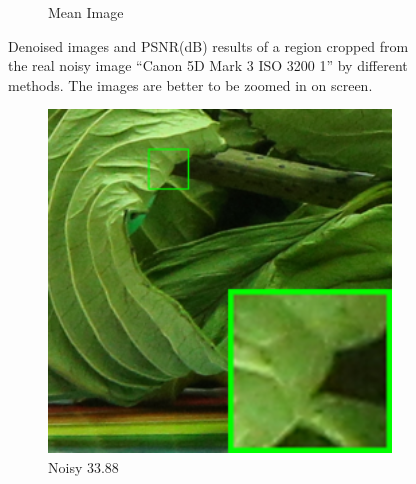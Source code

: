 \begin{figure}
\begin{subfigure}[t]{0.19\textwidth}
\caption{Mean Image}
    \end{subfigure}
    \caption{Denoised images and PSNR(dB) results of a region cropped from the real noisy image ``Canon 5D Mark 3 ISO 3200 1'' \cite{crosschannel2016} by different methods. The images are better to be zoomed in on screen.}
    \label{fig3-12}
\end{figure}


\begin{figure}
    \centering
    \begin{subfigure}[t]{0.19\textwidth}
        \centering
        \includegraphics[width=1\textwidth]{images/guided/cc15/resize_br_Noisy_5dmark3_iso3200_2_real.png}
		\caption{Noisy 33.88}
    \end{subfigure}
    \hfill
    \begin{subfigure}[t]{0.19\textwidth}
        \centering

\end{subfigure}
\end{figure}
